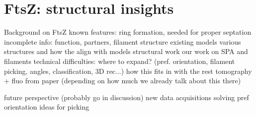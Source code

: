 \chapter{FtsZ: structural insights}

\begin{outline}
\1 Background on FtsZ
    \2 known features: ring formation, needed for proper septation
    \2 incomplete info: function, partners, filament structure
    \2 existing models
    \2 \cite{lutkenhausBacterialCytokinesisRing2012,szwedziakArchitectureRingFormed2014,fujitaStructuresFtsZSingle2023,sextonSuperresolutionConfocalCryoCLEM2022,liStructureFtsZFilaments2007}
    \2 various structures and how the align with models
\1 structural work
    \2 our work on SPA and filaments
        \3 technical difficulties: where to expand? (pref. orientation, filament picking, angles, classification, 3D rec...)
    \2 how this fits in with the rest
    \2 tomography + fluo from paper (depending on how much we already talk about this there)

\1 future perspective (probably go in discussion)
    \2 new data acquisitions
    \2 solving pref orientation
    \2 ideas for picking
\end{outline}
